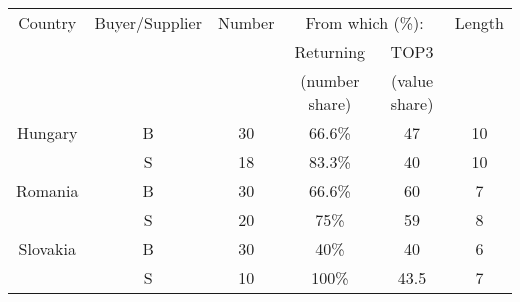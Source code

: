 
\begin{tabular}{cccccc}
\hline
    Country & Buyer/Supplier & Number & \multicolumn{2}{c}{From which (\%):} & Length \\
     & & & Returning & TOP3 & \\
     &&&(number share) & (value share) & \\
     \hline
     Hungary & B & 30 & 66.6\% & 47 &10 \\
      & S & 18 & 83.3\% & 40 &10 \\ 
     Romania & B & 30 & 66.6\% & 60 &7 \\
      & S & 20 & 75\% & 59 &8 \\
     Slovakia & B & 30 & 40\% & 40 &6 \\
      & S & 10 & 100\% & 43.5 &7 \\ \hline
\end{tabular}
